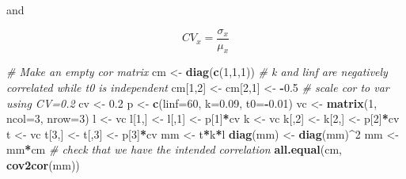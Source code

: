 \documentclass[
]{book}
\newenvironment{Shaded}{\begin{snugshade}}{\end{snugshade}}
\newcommand{\AttributeTok}[1]{\textcolor[rgb]{0.13,0.29,0.53}{#1}}
\newcommand{\CommentTok}[1]{\textcolor[rgb]{0.56,0.35,0.01}{\textit{#1}}}
\newcommand{\DecValTok}[1]{\textcolor[rgb]{0.00,0.00,0.81}{#1}}
\newcommand{\FloatTok}[1]{\textcolor[rgb]{0.00,0.00,0.81}{#1}}
\newcommand{\FunctionTok}[1]{\textcolor[rgb]{0.13,0.29,0.53}{\textbf{#1}}}
\newcommand{\NormalTok}[1]{#1}
\newcommand{\OtherTok}[1]{\textcolor[rgb]{0.56,0.35,0.01}{#1}}
\newcommand{\SpecialCharTok}[1]{\textcolor[rgb]{0.81,0.36,0.00}{\textbf{#1}}}
\begin{document}
and

\[CV_x=\frac{\sigma_x}{\mu_x}\]

\begin{Shaded}
\begin{Highlighting}[]
\CommentTok{\# Make an empty cor matrix}
\NormalTok{cm }\OtherTok{\textless{}{-}} \FunctionTok{diag}\NormalTok{(}\FunctionTok{c}\NormalTok{(}\DecValTok{1}\NormalTok{,}\DecValTok{1}\NormalTok{,}\DecValTok{1}\NormalTok{))}
\CommentTok{\# k and linf are negatively correlated while t0 is independent}
\NormalTok{cm[}\DecValTok{1}\NormalTok{,}\DecValTok{2}\NormalTok{] }\OtherTok{\textless{}{-}}\NormalTok{ cm[}\DecValTok{2}\NormalTok{,}\DecValTok{1}\NormalTok{] }\OtherTok{\textless{}{-}} \SpecialCharTok{{-}}\FloatTok{0.5}
\CommentTok{\# scale cor to var using CV=0.2}
\NormalTok{cv }\OtherTok{\textless{}{-}} \FloatTok{0.2}
\NormalTok{p }\OtherTok{\textless{}{-}} \FunctionTok{c}\NormalTok{(}\AttributeTok{linf=}\DecValTok{60}\NormalTok{, }\AttributeTok{k=}\FloatTok{0.09}\NormalTok{, }\AttributeTok{t0=}\SpecialCharTok{{-}}\FloatTok{0.01}\NormalTok{)}
\NormalTok{vc }\OtherTok{\textless{}{-}} \FunctionTok{matrix}\NormalTok{(}\DecValTok{1}\NormalTok{, }\AttributeTok{ncol=}\DecValTok{3}\NormalTok{, }\AttributeTok{nrow=}\DecValTok{3}\NormalTok{)}
\NormalTok{l }\OtherTok{\textless{}{-}}\NormalTok{ vc}
\NormalTok{l[}\DecValTok{1}\NormalTok{,] }\OtherTok{\textless{}{-}}\NormalTok{ l[,}\DecValTok{1}\NormalTok{] }\OtherTok{\textless{}{-}}\NormalTok{ p[}\DecValTok{1}\NormalTok{]}\SpecialCharTok{*}\NormalTok{cv}
\NormalTok{k }\OtherTok{\textless{}{-}}\NormalTok{ vc}
\NormalTok{k[,}\DecValTok{2}\NormalTok{] }\OtherTok{\textless{}{-}}\NormalTok{ k[}\DecValTok{2}\NormalTok{,] }\OtherTok{\textless{}{-}}\NormalTok{ p[}\DecValTok{2}\NormalTok{]}\SpecialCharTok{*}\NormalTok{cv}
\NormalTok{t }\OtherTok{\textless{}{-}}\NormalTok{ vc}
\NormalTok{t[}\DecValTok{3}\NormalTok{,] }\OtherTok{\textless{}{-}}\NormalTok{ t[,}\DecValTok{3}\NormalTok{] }\OtherTok{\textless{}{-}}\NormalTok{ p[}\DecValTok{3}\NormalTok{]}\SpecialCharTok{*}\NormalTok{cv}
\NormalTok{mm }\OtherTok{\textless{}{-}}\NormalTok{ t}\SpecialCharTok{*}\NormalTok{k}\SpecialCharTok{*}\NormalTok{l}
\FunctionTok{diag}\NormalTok{(mm) }\OtherTok{\textless{}{-}} \FunctionTok{diag}\NormalTok{(mm)}\SpecialCharTok{\^{}}\DecValTok{2}
\NormalTok{mm }\OtherTok{\textless{}{-}}\NormalTok{ mm}\SpecialCharTok{*}\NormalTok{cm}
\CommentTok{\# check that we have the intended correlation}
\FunctionTok{all.equal}\NormalTok{(cm, }\FunctionTok{cov2cor}\NormalTok{(mm))}
\end{Highlighting}
\end{Shaded}
\end{document}
